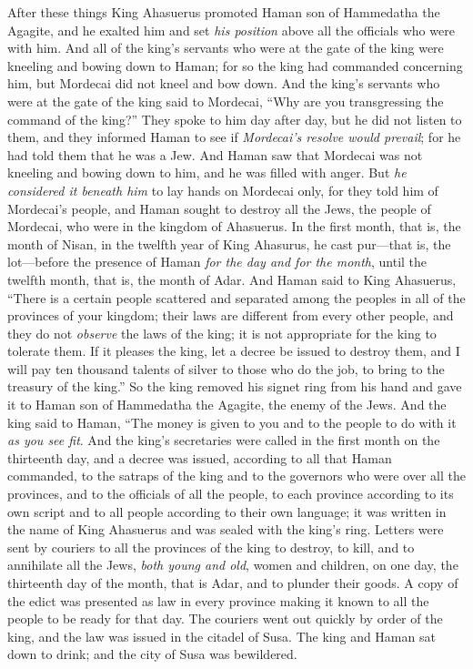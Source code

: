\begin{biblechapter} %
 After these things King Ahasuerus promoted Haman son of Hammedatha the Agagite, and he exalted him and set \textit{his position} above all the officials who were with him.
\verse And all of the king’s servants who were at the gate of the king were kneeling and bowing down to Haman; for so the king had commanded concerning him, but Mordecai did not kneel and bow down.
\verse And the king’s servants who were at the gate of the king said to Mordecai, “Why are you transgressing the command of the king?”
\verse They spoke to him day after day, but he did not listen to them, and they informed Haman to see if \textit{Mordecai’s resolve would prevail}; for he had told them that he was a Jew.
\verse And Haman saw that Mordecai was not kneeling and bowing down to him, and he was filled with anger.
\verse But \textit{he considered it beneath him} to lay hands on Mordecai only, for they told him of Mordecai’s people, and Haman sought to destroy all the Jews, the people of Mordecai, who were in the kingdom of Ahasuerus.
\verse In the first month, that is, the month of Nisan, in the twelfth year of King Ahasurus, he cast pur—that is, the lot—before the presence of Haman \textit{for the day and for the month}, until the twelfth month, that is, the month of Adar.
\verse And Haman said to King Ahasuerus, “There is a certain people scattered and separated among the peoples in all of the provinces of your kingdom; their laws are different from every other people, and they do not \textit{observe} the laws of the king; it is not appropriate for the king to tolerate them.
\verse If it pleases the king, let a decree be issued to destroy them, and I will pay ten thousand talents of silver to those who do the job, to bring to the treasury of the king.”
\verse So the king removed his signet ring from his hand and gave it to Haman son of Hammedatha the Agagite, the enemy of the Jews.
\verse And the king said to Haman, “The money is given to you and to the people to do with it \textit{as you see fit}.
\verse And the king’s secretaries were called in the first month on the thirteenth day, and a decree was issued, according to all that Haman commanded, to the satraps of the king and to the governors who were over all the provinces, and to the officials of all the people, to each province according to its own script and to all people according to their own language; it was written in the name of King Ahasuerus and was sealed with the king’s ring.
\verse Letters were sent by couriers to all the provinces of the king to destroy, to kill, and to annihilate all the Jews, \textit{both young and old}, women and children, on one day, the thirteenth day of the month, that is Adar, and to plunder their goods.
\verse A copy of the edict was presented as law in every province making it known to all the people to be ready for that day.
\verse The couriers went out quickly by order of the king, and the law was issued in the citadel of Susa. The king and Haman sat down to drink; and the city of Susa was bewildered.
\end{biblechapter}


